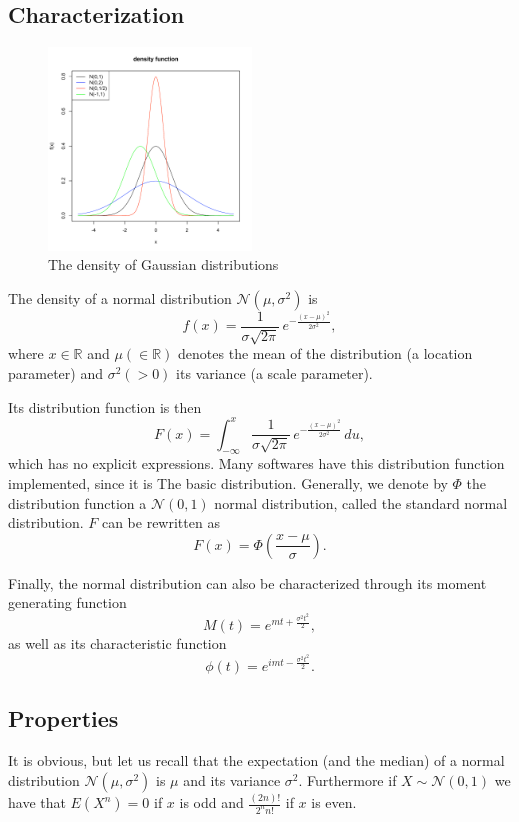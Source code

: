 \subsection{Characterization}
\begin{figure}
  \begin{center}
    \includegraphics[width=0.48\textwidth]{img/normzoom}
  \end{center}
  \caption{The density of Gaussian distributions}
\end{figure}

The density of a normal distribution $\mathcal N(\mu, \sigma^2)$ is 
$$
f(x) =  \frac{1}{\sigma\sqrt{2\pi}} \,e^{ -\frac{(x- \mu)^2}{2\sigma^2}},
$$
where $x\in \mathbb R$ and $\mu (\in \mathbb R)$ denotes the mean of the distribution (a location parameter) and $\sigma^2 (>0)$ its variance (a scale parameter).



Its distribution function is then
$$
F(x) = \int_{-\infty}^x \frac{1}{\sigma\sqrt{2\pi}} \,e^{ -\frac{(x- \mu)^2}{2\sigma^2}} \,du,
$$
which has no explicit expressions. Many softwares have this distribution function implemented, since it is The basic distribution. Generally, we denote by $\Phi$ the distribution function a $\mathcal N(0, 1)$ normal distribution, called the standard normal distribution. $F$ can be rewritten as
$$
F(x) = \Phi\left(\frac{x-\mu}{\sigma}\right).
$$

Finally, the normal distribution can also be characterized through its moment generating function
$$
M(t) = e^{mt + \frac{\sigma^2t^2}{2}},
$$
as well as its characteristic function
$$
\phi(t) = e^{imt - \frac{\sigma^2t^2}{2}}.
$$

\subsection{Properties}
It is obvious, but let us recall that the expectation (and the median) of a normal distribution $ \mathcal N(\mu, \sigma^2)$ is $\mu$ and its variance $\sigma^2$. Furthermore if $X\sim \mathcal N(0, 1)$ we have that $E(X^n) = 0$ if $x$ is odd and $\frac{(2n)!}{2^n n!}$ if $x$ is even.



